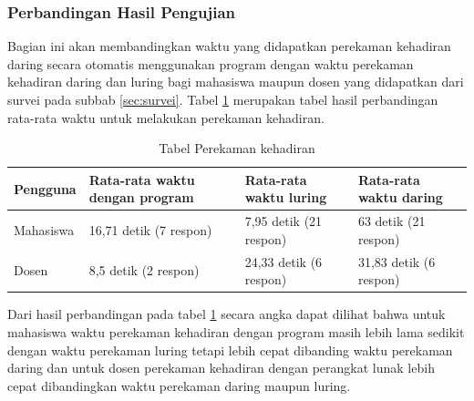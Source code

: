 \subsubsection{Perbandingan Hasil Pengujian}
Bagian ini akan membandingkan waktu yang didapatkan perekaman kehadiran daring secara otomatis menggunakan program dengan waktu perekaman kehadiran daring dan luring bagi mahasiswa maupun dosen yang didapatkan dari survei pada subbab \ref{sec:survei}. Tabel \ref{tab:banding} merupakan tabel hasil perbandingan rata-rata waktu untuk melakukan perekaman kehadiran.
\begin{table}[H]			
 	\caption{Tabel Perekaman kehadiran}
 	\centering
 	\begin{tabular}{|p{2cm} |p{4cm} |p{4cm}| p{4cm}|} \hline
 		Pengguna & Rata-rata waktu dengan program & Rata-rata waktu luring & Rata-rata waktu daring\\ \hline     
 		Mahasiswa & 16,71 detik (7 respon)& 7,95 detik (21 respon)& 63 detik (21 respon)\\ \hline 
 		Dosen & 8,5 detik (2 respon)&  24,33 detik (6 respon)& 31,83 detik (6 respon)\\ \hline 
 	\end{tabular}
 	\label{tab:banding} 
\end{table}
Dari hasil perbandingan pada tabel \ref{tab:banding} secara angka dapat dilihat bahwa untuk mahasiswa waktu perekaman kehadiran dengan program masih lebih lama sedikit dengan waktu perekaman luring tetapi lebih cepat dibanding waktu perekaman daring dan untuk dosen perekaman kehadiran dengan perangkat lunak lebih cepat dibandingkan waktu perekaman daring maupun luring.
